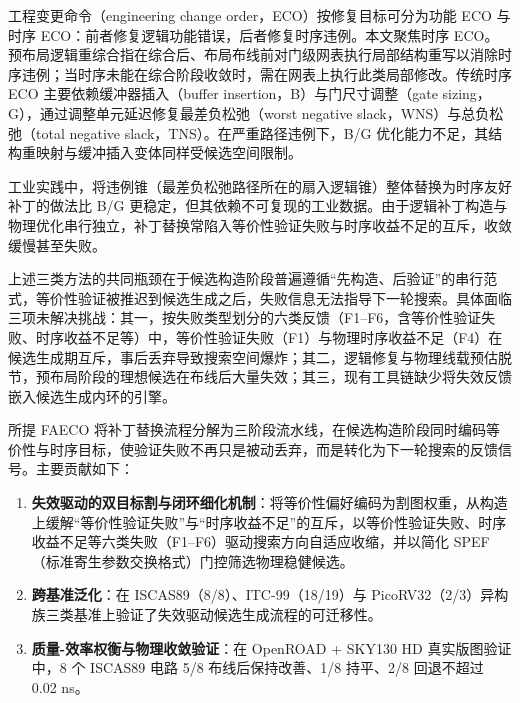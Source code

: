 \documentclass[twocolumn,10pt]{ctexart}
\begin{document}
工程变更命令（engineering change order，ECO）按修复目标可分为功能 ECO 与时序 ECO：前者修复逻辑功能错误，后者修复时序违例。本文聚焦时序 ECO。预布局逻辑重综合指在综合后、布局布线前对门级网表执行局部结构重写以消除时序违例；当时序未能在综合阶段收敛时，需在网表上执行此类局部修改。传统时序 ECO 主要依赖缓冲器插入（buffer insertion，B）与门尺寸调整（gate sizing，G），通过调整单元延迟修复最差负松弛（worst negative slack，WNS）与总负松弛（total negative slack，TNS）。在严重路径违例下，B/G 优化能力不足，其结构重映射与缓冲插入变体同样受候选空间限制\cite{chen2012metal,chen2012fixability,liang2012buffer,ho2010eco}。

工业实践中，将违例锥（最差负松弛路径所在的扇入逻辑锥）整体替换为时序友好补丁的做法比 B/G 更稳定，但其依赖不可复现的工业数据。由于逻辑补丁构造与物理优化串行独立，补丁替换常陷入等价性验证失败与时序收益不足的互斥，收敛缓慢甚至失败。

上述三类方法的共同瓶颈在于候选构造阶段普遍遵循“先构造、后验证”的串行范式，等价性验证被推迟到候选生成之后，失败信息无法指导下一轮搜索。具体面临三项未解决挑战：其一，按失败类型划分的六类反馈（F1--F6，含等价性验证失败、时序收益不足等）中，等价性验证失败（F1）与物理时序收益不足（F4）在候选生成期互斥，事后丢弃导致搜索空间爆炸；其二，逻辑修复与物理线载预估脱节，预布局阶段的理想候选在布线后大量失效；其三，现有工具链缺少将失效反馈嵌入候选生成内环的引擎。

所提 FAECO 将补丁替换流程分解为三阶段流水线，在候选构造阶段同时编码等价性与时序目标，使验证失败不再只是被动丢弃，而是转化为下一轮搜索的反馈信号。主要贡献如下：

\begin{enumerate}
  \item \textbf{失效驱动的双目标割与闭环细化机制}：将等价性偏好编码为割图权重，从构造上缓解“等价性验证失败”与“时序收益不足”的互斥，以等价性验证失败、时序收益不足等六类失败（F1--F6）驱动搜索方向自适应收缩，并以简化 SPEF（标准寄生参数交换格式）门控筛选物理稳健候选。
\item \textbf{跨基准泛化}：在 ISCAS89\cite{iscas89}（8/8）、ITC-99\cite{itc99}（18/19）与 PicoRV32\cite{picorv32}（2/3）异构族三类基准上验证了失效驱动候选生成流程的可迁移性。
\item \textbf{质量-效率权衡与物理收敛验证}：在 OpenROAD\cite{openroad} + SKY130 HD\cite{sky130} 真实版图验证中，8 个 ISCAS89 电路 5/8 布线后保持改善、1/8 持平、2/8 回退不超过 0.02 ns。
\end{enumerate}
\end{document}
